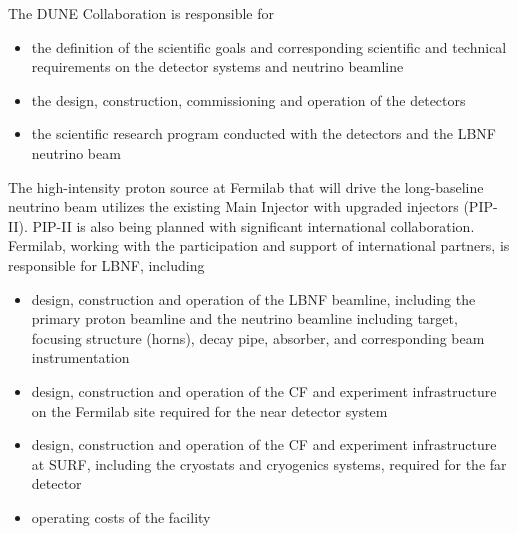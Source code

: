 The DUNE Collaboration is responsible for
\begin{itemize}
\item the definition of the scientific goals and corresponding scientific and technical requirements on the detector systems and neutrino beamline
\item the design, construction, commissioning and operation of the detectors
\item the scientific research program conducted with the detectors and the LBNF neutrino beam 
\end{itemize}

The high-intensity proton source at Fermilab that will drive the long-baseline neutrino beam utilizes the existing 
Main Injector with upgraded injectors (PIP-II).  PIP-II is also being planned with significant international collaboration.  Fermilab, working %
with the participation and support of international partners, is responsible for %
LBNF, including
\begin{itemize}
\item design, construction and operation of the LBNF beamline, including the primary proton beamline and the neutrino beamline including target, focusing structure (horns), decay pipe, absorber, and corresponding beam instrumentation
\item design, construction and operation of the CF and %
experiment infrastructure on the Fermilab site required for the near detector system
\item design, construction and operation of the CF and %
experiment infrastructure %
at SURF, including the cryostats and cryogenics systems, required for the far detector
\item %
operating costs of the facility 
\end{itemize}


